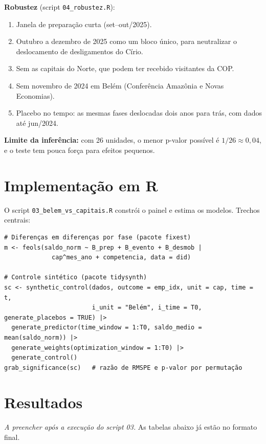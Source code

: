 \textbf{Robustez} (script \texttt{04\_robustez.R}):
\begin{enumerate}[leftmargin=*]
  \item Janela de preparação curta (set--out/2025).
  \item Outubro a dezembro de 2025 como um bloco único, para neutralizar o deslocamento de
        desligamentos do Círio.
  \item Sem as capitais do Norte, que podem ter recebido visitantes da COP.
  \item Sem novembro de 2024 em Belém (Conferência Amazônia e Novas Economias).
  \item Placebo no tempo: as mesmas fases deslocadas dois anos para trás, com dados até jun/2024.
\end{enumerate}
\textbf{Limite da inferência:} com 26 unidades, o menor p-valor possível é $1/26 \approx 0{,}04$, e o
teste tem pouca força para efeitos pequenos.


\section{Implementação em R}

O script \texttt{03\_belem\_vs\_capitais.R} constrói o painel e estima os modelos. Trechos centrais:

\begin{lstlisting}
# Diferenças em diferenças por fase (pacote fixest)
m <- feols(saldo_norm ~ B_prep + B_evento + B_desmob |
             cap^mes_ano + competencia, data = did)

# Controle sintético (pacote tidysynth)
sc <- synthetic_control(dados, outcome = emp_idx, unit = cap, time = t,
                        i_unit = "Belém", i_time = T0, generate_placebos = TRUE) |>
  generate_predictor(time_window = 1:T0, saldo_medio = mean(saldo_norm)) |>
  generate_weights(optimization_window = 1:T0) |>
  generate_control()
grab_significance(sc)   # razão de RMSPE e p-valor por permutação
\end{lstlisting}


\section{Resultados}

\textit{A preencher após a execução do script 03.} As tabelas abaixo já estão no formato final.


